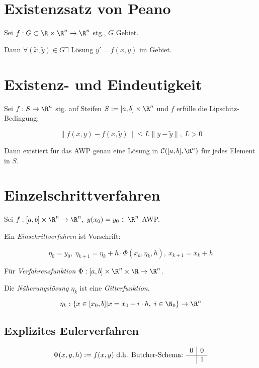 \section*{Existenzsatz von Peano}

Sei $f : G \subset \R \times \R^n \to \R^n$ stg., $G$ Gebiet.

Dann $\forall (\tilde x,\tilde y) \in G \exists$ Lösung $y'=f(x,y)$ im Gebiet.

\section*{Existenz- und Eindeutigkeit}

Sei $f : S \to \R^n$ stg. auf Steifen $S := [a,b] \times \R^n$ und $f$ erfülle die Lipschitz-Bedingung:

\vspace*{-2mm}
\[ \|f(x,y)-f(x,\tilde y)\| \leq L \|y-\tilde y\|, \ L > 0 \]

Dann existiert für das AWP genau eine Lösung in $\mathcal{C}([a,b],\R^n)$ für jedes Element in $S$.

\section*{Einzelschrittverfahren}

Sei $f : [a,b] \times \R^n \to \R^n, \ y(x_0)=y_0 \in \R^n$ AWP.

Ein \emph{Einschrittverfahren} ist Vorschrift:

\vspace*{-4mm}
\[ \eta_0 = y_0, \ \eta_{k+1} = \eta_k + h \cdot \Phi(x_k, \eta_k, h), \ x_{k+1} = x_k + h \]

Für \emph{Verfahrensfunktion} $\Phi : [a,b] \times \R^n \times \R \to \R^n$.

\spacing

Die \emph{Näherungslösung} $\eta_k$ ist eine \emph{Gitterfunktion}.

\vspace*{-4mm}
\[ \eta_k : \{x \in [x_0,b] | x = x_0 + i \cdot h, \ i \in \N_0 \} \to \R^n \]

\subsection*{Explizites Eulerverfahren}

\[ \Phi(x,y,h) := f(x,y) \text{ d.h. Butcher-Schema: } \begin{array}{c|c}
0 & 0 \\
\hline
  & 1
\end{array} \]

